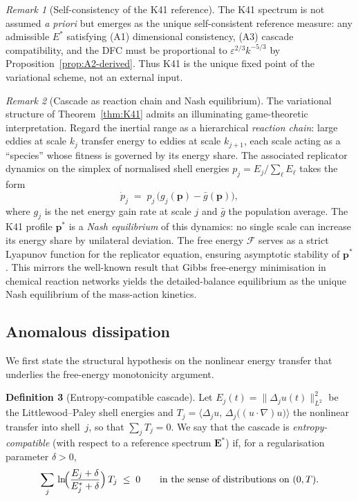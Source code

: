 \documentclass[12pt,a4paper]{article}
\theoremstyle{definition}
\newtheorem{definition}{Definition}[section]
\theoremstyle{plain}
\theoremstyle{remark}
\newtheorem{remark}[definition]{Remark}
\begin{document}
\begin{remark}[Self-consistency of the K41 reference]
\label{rem:k41-selfconsistency}
The K41 spectrum is not assumed \emph{a priori} but emerges as the unique self-consistent reference measure: any admissible $E^*$ satisfying (A1) dimensional consistency, (A3) cascade compatibility, and the DFC must be proportional to $\varepsilon^{2/3} k^{-5/3}$ by Proposition~\ref{prop:A2-derived}. Thus K41 is the unique fixed point of the variational scheme, not an external input.
\end{remark}

\begin{remark}[Cascade as reaction chain and Nash equilibrium]\label{rem:nash}
The variational structure of Theorem~\ref{thm:K41} admits an illuminating
game-theoretic interpretation.  Regard the inertial range as a
hierarchical \emph{reaction chain}: large eddies at scale $k_j$ transfer
energy to eddies at scale $k_{j+1}$, each scale acting as a ``species''
whose fitness is governed by its energy share.  The associated replicator
dynamics on the simplex of normalised shell energies
$p_j = E_j / \sum_\ell E_\ell$ takes the form
\[
  \dot{p}_j
  \;=\;
  p_j\,\bigl(g_j(\mathbf{p}) - \bar{g}(\mathbf{p})\bigr),
\]
where $g_j$ is the net energy gain rate at scale $j$ and $\bar{g}$ the
population average.  The K41 profile $\mathbf{p}^*$ is a \emph{Nash
equilibrium} of this dynamics: no single scale can increase its energy share
by unilateral deviation.  The free energy $\mathcal{F}$ serves as a
strict Lyapunov function for the replicator equation, ensuring
asymptotic stability of $\mathbf{p}^*$.
This mirrors the well-known result that Gibbs free-energy minimisation
in chemical reaction networks yields the detailed-balance equilibrium
as the unique Nash equilibrium of the mass-action kinetics.
\end{remark}

\subsection{Anomalous dissipation}

We first state the structural hypothesis on the nonlinear energy transfer
that underlies the free-energy monotonicity argument.

\begin{definition}[Entropy-compatible cascade]\label{def:NL}
Let $E_j(t) = \|\Delta_j u(t)\|_{L^2}^2$ be the Littlewood--Paley shell
energies and $T_j = \langle \Delta_j u,\, \Delta_j\bigl((u\cdot\nabla)u\bigr)\rangle$
the nonlinear transfer into shell~$j$, so that $\sum_j T_j = 0$.
We say that the cascade is \emph{entropy-compatible} (with respect to a
reference spectrum $\mathbf{E}^*$) if, for a regularisation parameter
$\delta > 0$,
\begin{equation}\label{eq:NL}
  \sum_{j}\,\ln\!\Bigl(\frac{E_j + \delta}{E_j^* + \delta}\Bigr)\,T_j
  \;\le\; 0
  \qquad \text{in the sense of distributions on } (0,T).
\end{equation}
\end{definition}
\end{document}
